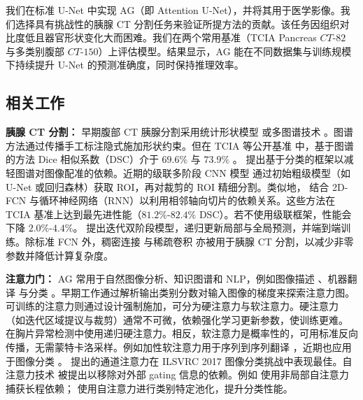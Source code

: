 \documentclass{article}
\begin{document}
我们在标准 U-Net 中实现 AG（即 Attention U-Net），并将其用于医学影像。我们选择具有挑战性的胰腺 CT 分割任务来验证所提方法的贡献。该任务因组织对比度低且器官形状变化大而困难。我们在两个常用基准（TCIA Pancreas $CT$-$82$ \cite{tciapancreas} 与多类别腹部 $CT$-$150$）上评估模型。结果显示，AG 能在不同数据集与训练规模下持续提升 U-Net 的预测准确度，同时保持推理效率。 

\vspace{-1.0 mm}
\subsection{相关工作}
\textbf{胰腺 CT 分割：} 早期腹部 CT 胰腺分割采用统计形状模型 \cite{cerrolaza2016soft, saito2016joint} 或多图谱技术 \cite{oda20173d, wolz2013automated}。图谱方法通过传播手工标注隐式施加形状约束。但在 TCIA 等公开基准 \cite{tciapancreas} 中，基于图谱的方法 Dice 相似系数（DSC）介于 $69.6\%$ 与 $73.9\%$ \cite{oda20173d, wolz2013automated}。\cite{zografos2015hierarchical} 提出基于分类的框架以减轻图谱对图像配准的依赖。近期的级联多阶段 CNN 模型 \cite{roth2018media, roth2017hierarchical, zhou2017fixed} 通过初始粗级模型（如 U-Net 或回归森林）获取 ROI，再对裁剪的 ROI 精细分割。类似地，\cite{cai2017improving} 结合 2D-FCN 与循环神经网络（RNN）以利用相邻轴向切片的依赖关系。这些方法在 TCIA 基准上达到最先进性能（$81.2\%$-$82.4\%$ DSC）。若不使用级联框架，性能会下降 $2.0\%$-$4.4\%$。\cite{yu2017saliency} 提出迭代双阶段模型，递归更新局部与全局预测，并端到端训练。除标准 FCN 外，稠密连接 \cite{gibson2017towards} 与稀疏卷积 \cite{heinrich2018ternarynet, heinrich2017briefnet} 亦被用于胰腺 CT 分割，以减少非零参数并降低计算复杂度。 

\textbf{注意力门：} AG 常用于自然图像分析、知识图谱和 NLP，例如图像描述 \cite{anderson2017bottom}、机器翻译 \cite{bahdanau2014neural, vaswani2017attention} 与分类 \cite{jetley2018learn, velivckovic2017graph, wang2017residual}。早期工作通过解析输出类别分数对输入图像的梯度来探索注意力图。可训练的注意力则通过设计强制施加，可分为硬注意力与软注意力。硬注意力 \cite{mnih2014recurrent}（如迭代区域提议与裁剪）通常不可微，依赖强化学习更新参数，使训练更难。\cite{ypsilantis2017learning} 在胸片异常检测中使用递归硬注意力。相反，软注意力是概率性的，可用标准反向传播，无需蒙特卡洛采样。例如加性软注意力用于序列到序列翻译 \cite{bahdanau2014neural, shen2017disan}，近期也应用于图像分类 \cite{jetley2018learn, wang2017residual}。\cite{hu2017squeeze} 提出的通道注意力在 ILSVRC 2017 图像分类挑战中表现最佳。自注意力技术 \cite{jetley2018learn,wang2017non} 被提出以移除对外部 gating 信息的依赖。例如 \cite{wang2017non} 使用非局部自注意力捕获长程依赖；\cite{jetley2018learn, wang2017residual} 使用自注意力进行类别特定池化，提升分类性能。  
\end{document}
